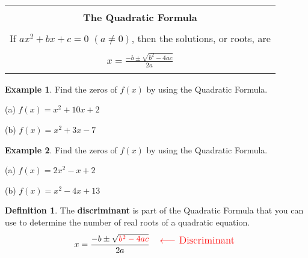 \documentclass{report}
\theoremstyle{definition}
\newtheorem{example}{\bf Example}
\newtheorem{definition}{\bf Definition}[section]
\begin{document}
\vspace{-0.5cm}

\begin{center}
	\begin{tabular}[t]{|c|}
	\hline 
	\\
	\textbf{The Quadratic Formula}\\
	\hline
	\\
	\qquad\qquad If $ax^2+bx+c=0$ $(a\neq 0)$, then the solutions, or roots, are \qquad\qquad\\
	\\
	$x=\displaystyle\frac{-b\pm \sqrt{b^2-4ac}}{2a}$ \\
	\\
	\hline
	\end{tabular}
\end{center}

\begin{example}
Find the zeros of $f(x)$ by using the Quadratic Formula.
\end{example}

\begin{minipage}[t]{0.45\linewidth}
(a) $f(x)=x^2+10x+2$
\end{minipage}
\hfill
\begin{minipage}[t]{0.45\linewidth}
(b) $f(x)=x^2+3x-7$
\end{minipage}

 \newpage

\begin{example}
Find the zeros of $f(x)$ by using the Quadratic Formula.
\end{example}

\begin{minipage}[t]{0.45\linewidth}
(a) $f(x) = 2x^2-x+2$
\end{minipage}
\hfill
\begin{minipage}[t]{0.45\linewidth}
(b) $f(x)=x^2-4x+13$
\end{minipage}
\vfill

\begin{definition}
The \textbf{discriminant} is part of the Quadratic Formula that you can use to determine the number of real roots of a quadratic equation.
\[\large x=\frac{-b\pm\sqrt{\color{red}b^2-4ac\color{black}}}{2a} \quad \stackanchor{$\color{red}\longleftarrow$ \color{red} Discriminant \color{black}}{}\normalsize\]
\end{definition}
\end{document}
